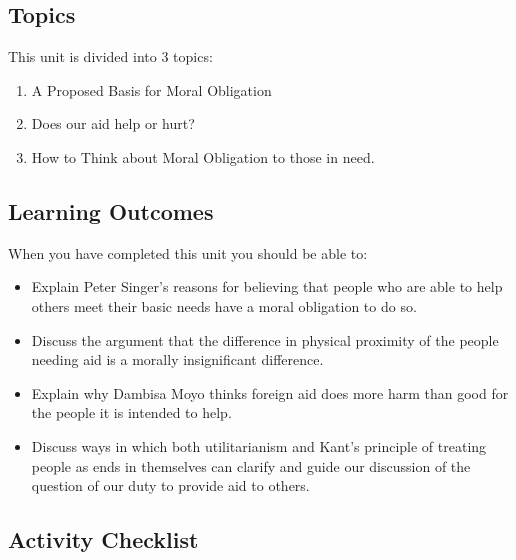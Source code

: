 \documentclass[
]{book}
\providecommand{\tightlist}{%
  \setlength{\itemsep}{0pt}\setlength{\parskip}{0pt}}
\begin{document}
\hypertarget{topics-9}{%
\subsection*{Topics}\label{topics-9}}

This unit is divided into 3 topics:

\begin{enumerate}
\def\labelenumi{\arabic{enumi}.}
\tightlist
\item
  A Proposed Basis for Moral Obligation\\
\item
  Does our aid help or hurt?\\
\item
  How to Think about Moral Obligation to those in need.
\end{enumerate}

\hypertarget{learning-outcomes-9}{%
\subsection*{Learning Outcomes}\label{learning-outcomes-9}}

When you have completed this unit you should be able to:

\begin{itemize}
\tightlist
\item
  Explain Peter Singer's reasons for believing that people who are able to help others meet their basic needs have a moral obligation to do so.\\
\item
  Discuss the argument that the difference in physical proximity of the people needing aid is a morally insignificant difference.\\
\item
  Explain why Dambisa Moyo thinks foreign aid does more harm than good for the people it is intended to help.\\
\item
  Discuss ways in which both utilitarianism and Kant's principle of treating people as ends in themselves can clarify and guide our discussion of the question of our duty to provide aid to others.
\end{itemize}

\hypertarget{activity-checklist-9}{%
\subsection*{Activity Checklist}\label{activity-checklist-9}}
\end{document}

